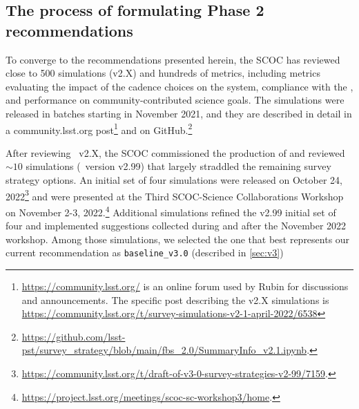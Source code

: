 \subsection{The process of formulating Phase 2 recommendations}\label{ssec:process}


To converge to the recommendations presented herein, the SCOC has reviewed close to 500 simulations (v2.X) and hundreds of metrics, including metrics evaluating the impact of the cadence choices on the system, compliance with the , and performance on community-contributed science goals. The simulations were released in batches starting in November 2021, and they are described in detail in a  community.lsst.org post\footnote{\url{https://community.lsst.org/} is an online forum used by Rubin for discussions and announcements. The specific post describing the v2.X simulations is \url{https://community.lsst.org/t/survey-simulations-v2-1-april-2022/6538}} and on GitHub.\footnote{\url{https://github.com/lsst-pst/survey_strategy/blob/main/fbs_2.0/SummaryInfo_v2.1.ipynb}.}

After reviewing \opsim\ v2.X, the SCOC commissioned the production of and reviewed $\sim 10$ simulations (\opsim\ version v2.99) that largely straddled the remaining survey strategy options. An initial set of four simulations were released on October 24, 2022\footnote{\url{ https://community.lsst.org/t/draft-of-v3-0-survey-strategies-v2-99/7159}.} and were presented at the Third SCOC-Science Collaborations Workshop on November 2-3, 2022.\footnote{\url{https://project.lsst.org/meetings/scoc-sc-workshop3/home}.}  Additional simulations refined the v2.99 initial set of four and implemented suggestions collected during and after the November 2022 workshop. Among those simulations, we selected the one that best represents our current recommendation as \texttt{baseline\_v3.0} (described in \autoref{sec:v3})

